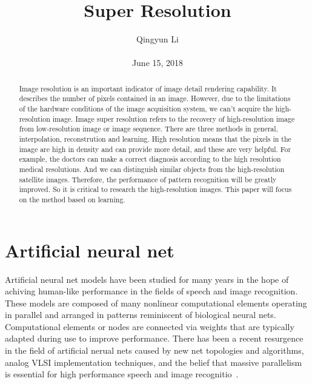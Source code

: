 \documentclass[10pt,twocolumn,letterpaper]{article}
\begin{document}
\author{Qingyun Li\\\\
June 15, 2018}        
\title{Super Resolution}

\maketitle

\begin{abstract}
 \par
  Image resolution is an important indicator of image detail rendering capability. It describes the number of pixels contained in an image. However, due to the limitations of the hardware conditions of the image acquisition system, we can't acquire the high-resolution image. Image super resolution refers to the recovery of high-resolution image from low-resolution image or image sequence. There are three methods in general, interpolation, reconstrution and learning.  High resolution means that the pixels in the image are high in density and can provide more detail, and these are very helpful. For example, the doctors can make a correct diagnosis according to the high resolution medical resolutions. And we can distinguish similar objects from the high-resolution satellite images. Therefore, the performance of pattern recognition will be greatly improved. So it is critical to research the high-resolution images. This paper will focus on the method based on learning.
\end{abstract}
\section{Artificial neural net}
 \par Artificial neural net models have been studied for many years in the hope of achiving human-like performance in the fields of speech and image recognition. These models are composed of many nonlinear computational elements operating in parallel and arranged in patterns reminiscent of biological neural nets. Computational elements or nodes are connected via weights that are typically adapted during use to improve performance. There has been a recent resurgence in the field of artificial nerual nets caused by new net topologies and algorithms, analog VLSI implementation techniques, and the belief that massive parallelism is essential for high performance speech and image recognitio~\cite{lippmann1987introduction}.
\end{document}
